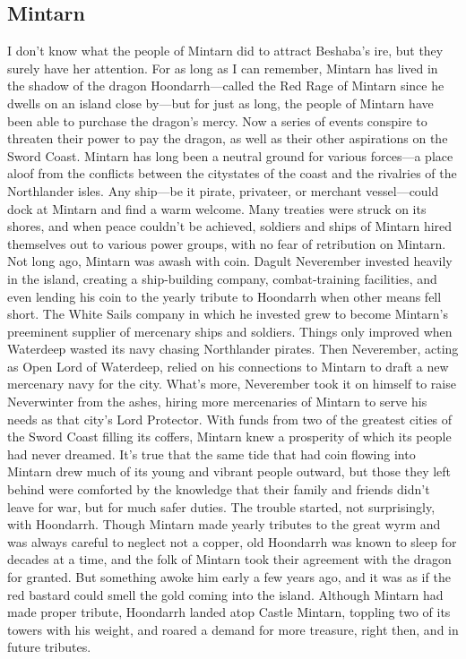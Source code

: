 \documentclass[10pt,a4paper,twoside,twocolumn,openany,bg=print,nodeprecatedcode]{dndbook}
\begin{document}
\subsection{Mintarn}
I don't know what the people of Mintarn did to attract Beshaba's ire, but they surely have her attention. For as long as I can remember, Mintarn has lived in the shadow of the dragon Hoondarrh—called the Red Rage of Mintarn since he dwells on an island close by—but for just as long, the people of Mintarn have been able to purchase the dragon's mercy. Now a series of events conspire to threaten their power to pay the dragon, as well as their other aspirations on the Sword Coast.
Mintarn has long been a neutral ground for various forces—a place aloof from the conflicts between the citystates of the coast and the rivalries of the Northlander isles. Any ship—be it pirate, privateer, or merchant vessel—could dock at Mintarn and find a warm welcome. Many treaties were struck on its shores, and when peace couldn't be achieved, soldiers and ships of Mintarn hired themselves out to various power groups, with no fear of retribution on Mintarn.
Not long ago, Mintarn was awash with coin. Dagult Neverember invested heavily in the island, creating a ship-building company, combat-training facilities, and even lending his coin to the yearly tribute to Hoondarrh when other means fell short. The White Sails company in which he invested grew to become Mintarn's preeminent supplier of mercenary ships and soldiers.
Things only improved when Waterdeep wasted its navy chasing Northlander pirates. Then Neverember, acting as Open Lord of Waterdeep, relied on his connections to Mintarn to draft a new mercenary navy for the city. What's more, Neverember took it on himself to raise Neverwinter from the ashes, hiring more mercenaries of Mintarn to serve his needs as that city's Lord Protector.
With funds from two of the greatest cities of the Sword Coast filling its coffers, Mintarn knew a prosperity of which its people had never dreamed. It's true that the same tide that had coin flowing into Mintarn drew much of its young and vibrant people outward, but those they left behind were comforted by the knowledge that their family and friends didn't leave for war, but for much safer duties.
The trouble started, not surprisingly, with Hoondarrh. Though Mintarn made yearly tributes to the great wyrm and was always careful to neglect not a copper, old Hoondarrh was known to sleep for decades at a time, and the folk of Mintarn took their agreement with the dragon for granted. But something awoke him early a few years ago, and it was as if the red bastard could smell the gold coming into the island. Although Mintarn had made proper tribute, Hoondarrh landed atop Castle Mintarn, toppling two of its towers with his weight, and roared a demand for more treasure, right then, and in future tributes.
\end{document}
